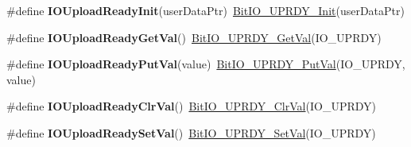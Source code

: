 \begin{DoxyCompactItemize}
\item 
\hypertarget{group___func_ala_gafaf9e5d670b83006465f3c1166b686a1}{\#define {\bfseries I\-O\-Upload\-Ready\-Init}(user\-Data\-Ptr)~\hyperlink{group___bit_i_o___u_p_r_d_y__module_ga16fba3e6a57959037ec1b6f4183a93bf}{Bit\-I\-O\-\_\-\-U\-P\-R\-D\-Y\-\_\-\-Init}(user\-Data\-Ptr)}\label{group___func_ala_gafaf9e5d670b83006465f3c1166b686a1}

\item 
\hypertarget{group___func_ala_gaa7369184ff942599708a04f0ec9bfdb8}{\#define {\bfseries I\-O\-Upload\-Ready\-Get\-Val}()~\hyperlink{group___bit_i_o___u_p_r_d_y__module_ga81bcdf8e406ba157db74916e9e92fe1b}{Bit\-I\-O\-\_\-\-U\-P\-R\-D\-Y\-\_\-\-Get\-Val}(I\-O\-\_\-\-U\-P\-R\-D\-Y)}\label{group___func_ala_gaa7369184ff942599708a04f0ec9bfdb8}

\item 
\hypertarget{group___func_ala_gac778cdf3ca8926a49703ad5cd6710087}{\#define {\bfseries I\-O\-Upload\-Ready\-Put\-Val}(value)~\hyperlink{group___bit_i_o___u_p_r_d_y__module_gaf732785b20487680826483805a012205}{Bit\-I\-O\-\_\-\-U\-P\-R\-D\-Y\-\_\-\-Put\-Val}(I\-O\-\_\-\-U\-P\-R\-D\-Y, value)}\label{group___func_ala_gac778cdf3ca8926a49703ad5cd6710087}

\item 
\hypertarget{group___func_ala_ga2447764f94a99c29f27f1111bfd4a664}{\#define {\bfseries I\-O\-Upload\-Ready\-Clr\-Val}()~\hyperlink{group___bit_i_o___u_p_r_d_y__module_gae41a939598ee06853fa018667b9ba27a}{Bit\-I\-O\-\_\-\-U\-P\-R\-D\-Y\-\_\-\-Clr\-Val}(I\-O\-\_\-\-U\-P\-R\-D\-Y)}\label{group___func_ala_ga2447764f94a99c29f27f1111bfd4a664}

\item 
\hypertarget{group___func_ala_gac682acf3c2d01869eedd08ed6df2e2a0}{\#define {\bfseries I\-O\-Upload\-Ready\-Set\-Val}()~\hyperlink{group___bit_i_o___u_p_r_d_y__module_gac70117da5c49eebd6eed8745bc7db5ac}{Bit\-I\-O\-\_\-\-U\-P\-R\-D\-Y\-\_\-\-Set\-Val}(I\-O\-\_\-\-U\-P\-R\-D\-Y)}\label{group___func_ala_gac682acf3c2d01869eedd08ed6df2e2a0}

\end{DoxyCompactItemize}
